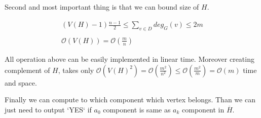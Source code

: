 \documentclass{article}
\begin{document}
Second and most important thing is that we can bound size of $H$.

\begin{gather*}
    (V(H) - 1) \frac{n-1}{2} \leqslant \sum_{v \in D} {deg_G(v)} \leqslant 2m \\
    \\
    \mathcal{O}(V(H)) = \mathcal{O}\left(\frac{m}{n}\right)
\end{gather*}

All operation above can be easily implemented in linear time. Moreover creating complement of $H$,
takes only $\mathcal{O}\left(V(H)^2\right) = \mathcal{O}\left(\frac{m^2}{n^2}\right) \leqslant \mathcal{O}\left(\frac{m^2}{m}\right) = 
\mathcal{O}(m)$ time and space.

Finally we can compute to which component which vertex belongs. Than we can just need to output `YES` if $a_0$ component is same as $a_k$ component in $\overline{H}$.
\end{document}

